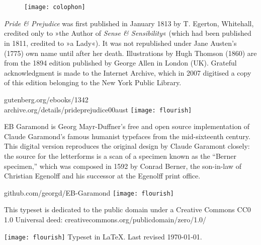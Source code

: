 \documentclass[
a5paper,
]{scrbook}
\begin{document}


\renewcommand*{\chapterheadendvskip}{\vfill}
\renewcommand*{\chapterheadstartvskip}{\vfill}

\chapter*{}

\centering

\begin{figure}[t!]
\centering
\texttt{[image: colophon]}
\end{figure}
\vfill
\begin{minipage}{\textwidth}
\textit{Pride \& Prejudice} was first published in January 1813 by T. Egerton, Whitehall, credited only to »the Author of \textit{Sense \& Sensibility}« (which had been published in 1811, credited to »a Lady«). It was not republished under Jane Austen's (1775) own name until after her death. Illustrations by Hugh Thomson (1860) are from the 1894 edition published by George Allen in London (UK). Grateful acknowledgment is made to the Internet Archive, which in 2007 digitised a copy of this edition belonging to the New York Public Library.
\end{minipage}
\vfill
gutenberg.org/ebooks/1342\\archive.org/details/prideprejudice00aust
\vfill
\texttt{[image: flourish]}
\vfill
\begin{minipage}{\textwidth}
EB Garamond is Georg Mayr-Duffner's free and open source implementation of Claude Garamond’s famous humanist typefaces from the mid-sixteenth century. This digital version reproduces the original design by Claude Garamont closely: the source for the letterforms is a scan of a specimen known as the \enquote{Berner specimen,} which was composed in 1592 by Conrad Berner, the son-in-law of Christian Egenolff and his successor at the Egenolff print office.
\end{minipage}
\vfill
github.com/georgd/EB-Garamond
\vfill
\texttt{[image: flourish]}
\vfill
\begin{minipage}{\textwidth}
This typeset is dedicated to the public domain under a Creative Commons CC0 1.0 Universal deed: creativecommons.org/publicdomain/zero/1.0/\\
\end{minipage}
\vfill
\texttt{[image: flourish]}
\vfill
Typeset in \LaTeX{}. Last revised \today.
\thispagestyle{empty}
\end{document}
